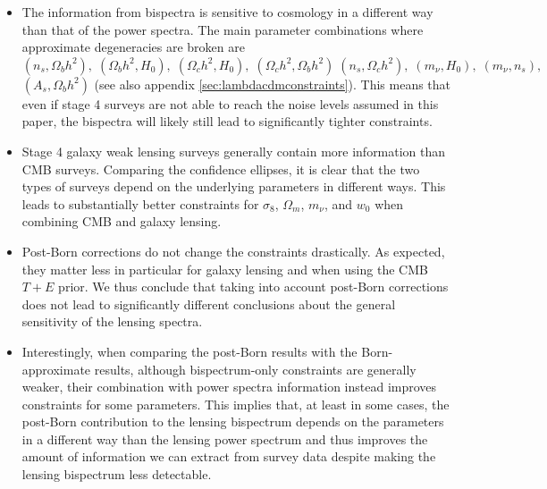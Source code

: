 \documentclass[11pt]{article} %
\begin{document}
\begin{itemize}
    \item The information from bispectra is sensitive to cosmology in a different way than that of the power spectra. The main parameter combinations where approximate degeneracies are broken are $(n_s,\Omega_b h^2),\;(\Omega_b h^2,H_0),\;(\Omega_c h^2,H_0),\;(\Omega_c h^2,\Omega_b h^2)\;(n_s,\Omega_c h^2),\;(m_\nu,H_0),\;(m_\nu,n_s),$ $(A_s,\Omega_b h^2)$ (see also appendix \ref{sec:lambdacdmconstraints}). This means that even if stage 4 surveys are not able to reach the noise levels assumed in this paper, the bispectra will likely still lead to significantly tighter constraints.

    \item Stage 4 galaxy weak lensing surveys generally contain more information than CMB surveys. 
    Comparing the confidence ellipses, it is clear that the two types of surveys depend on the underlying parameters in different ways. This leads to substantially better constraints for $\sigma_8$, $\Omega_m$, $m_\nu$, and $w_0$ when combining CMB and galaxy lensing.

    \item Post-Born corrections do not change the constraints drastically. As expected, they matter less in particular for galaxy lensing and when using the CMB $T+E$ prior. We thus conclude that taking into account post-Born corrections does not lead to significantly different conclusions about the general sensitivity of the lensing spectra.
    
    \item Interestingly, when comparing the post-Born results with the Born-approximate results, although bispectrum-only constraints are generally weaker, their combination with power spectra information instead improves constraints for some parameters. This implies that, at least in some cases, the post-Born contribution to the lensing bispectrum depends on the parameters in a different way than the lensing power spectrum and thus improves the amount of information we can extract from survey data despite making the lensing bispectrum less detectable. 
\end{itemize}
\end{document}
